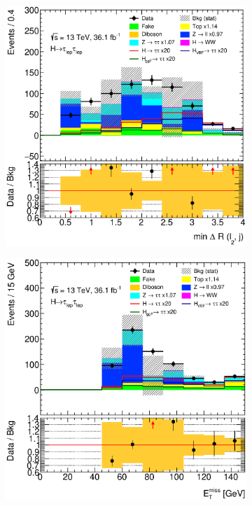 \begin{figure}[htb]
\begin{subfigure}[t]{0.3\textwidth}
    \end{subfigure}
    \begin{subfigure}[t]{0.3\textwidth}
        \includegraphics[width=\textwidth]{./plots/mva/modeling/input_vars/VBF_SF/ll-CutMVAVBFCatSF-dRminLep1Jet-lin.eps}
    \end{subfigure}
    \begin{subfigure}[t]{0.3\textwidth}
        \includegraphics[width=\textwidth]{./plots/mva/modeling/input_vars/VBF_SF/ll-CutMVAVBFCatSF-MET-lin.eps}

\end{subfigure}
\end{figure}
